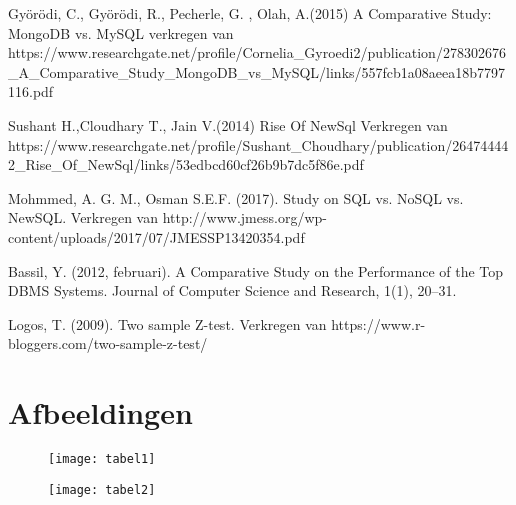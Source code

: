 \documentclass[fleqn,10pt]{artikeltin}
\begin{document}
\vspace{5mm} %

 Györödi, C., Györödi, R., Pecherle, G. , Olah, A.(2015) A Comparative Study: MongoDB vs. MySQL verkregen van https://www.researchgate.net/profile/Cornelia\_Gyroedi2/publication/278302676\_A\_Comparative\_Study\_MongoDB\_vs\_MySQL/links/557fcb1a08aeea18b7797116.pdf

\vspace{5mm} %

Sushant H.,Cloudhary T., Jain V.(2014) Rise Of NewSql Verkregen van https://www.researchgate.net/profile/Sushant\_Choudhary/publication/264744442\_Rise\_Of\_NewSql/links/53edbcd60cf26b9b7dc5f86e.pdf

\vspace{5mm} %

Mohmmed, A. G. M., Osman S.E.F. (2017). Study on SQL vs. NoSQL vs. NewSQL. Verkregen van http://www.jmess.org/wp-content/uploads/2017/07/JMESSP13420354.pdf

\vspace{5mm} %

Bassil, Y. (2012, februari). A Comparative Study on the Performance of the Top DBMS Systems. Journal of Computer
Science and Research, 1(1), 20–31.

\vspace{5mm} %

Logos, T. (2009). Two sample Z-test. Verkregen van https://www.r-bloggers.com/two-sample-z-test/

\vspace{5mm} %


\section{Afbeeldingen}
\label{afbeeldingen}
\newpage
\vspace{5mm} %

\begin{figure}
	\centering
	\texttt{[image: tabel1]}
	\caption{}
\end{figure}

\vspace{5mm} %

\begin{figure}
	\centering
	\texttt{[image: tabel2]}
	\caption{}
\end{figure}
\end{document}
